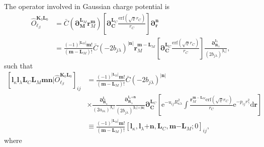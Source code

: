 \documentclass[a4paper,11pt,twoside,openright]{book}
\begin{document}
The operator involved in Gaussian charge potential is
\begin{align}
  \hat{O}_{\ell_{\beta}}^{\boldsymbol{K}_{0}\boldsymbol{L}_{0}}%
  &=\bar{C}\left(\boldsymbol{\partial}_{\boldsymbol{M}}^{\boldsymbol{L}_{M}}\boldsymbol{r}_{M}^{\boldsymbol{m}}\right)%
    \left[\boldsymbol{\partial}_{\boldsymbol{C}}^{\boldsymbol{L}_{C}}\frac{\mathrm{erf}\left(\sqrt{\varrho}r_{C}\right)}{r_{C}}\right]%
    \boldsymbol{\partial}_{\boldsymbol{r}}^{\boldsymbol{n}}\\
  &=\frac{(-1)^{|\boldsymbol{L}_{M}|}\boldsymbol{m}!}{(\boldsymbol{m}-\boldsymbol{L}_{M})!}%
    \bar{C}(-2b_{j\lambda})^{|\boldsymbol{n}|}%
    \boldsymbol{r}_{M}^{\boldsymbol{m}-\boldsymbol{L}_{M}}%
    \left[\boldsymbol{\partial}_{\boldsymbol{C}}^{\boldsymbol{L}_{C}}\frac{\mathrm{erf}\left(\sqrt{\varrho}r_{C}\right)}{r_{C}}\right]%
    \frac{\boldsymbol{\partial}_{\boldsymbol{R}_{\lambda}}^{\boldsymbol{l}_{\lambda}}}%
      {(2b_{j\lambda})^{|\boldsymbol{l}_{\lambda}|}},\nonumber
\end{align}
such that
\begin{align}
  \left[\boldsymbol{l}_{\kappa}\boldsymbol{l}_{\lambda}\boldsymbol{L}_{C}%
    \boldsymbol{L}_{M}\boldsymbol{m}\boldsymbol{n}\Big|%
    \hat{O}_{\ell_{\beta}}^{\boldsymbol{K}_{0}\boldsymbol{L}_{0}}\right]_{ij}
  &=\frac{(-1)^{|\boldsymbol{L}_{M}|}\boldsymbol{m}!}{(\boldsymbol{m}-\boldsymbol{L}_{M})!}%
    \bar{C}(-2b_{j\lambda})^{|\boldsymbol{n}|}\\
  &\times\frac{\boldsymbol{\partial}_{\boldsymbol{R}_{\kappa}}^{\boldsymbol{l}_{\kappa}}}%
      {(2a_{i\kappa})^{|\boldsymbol{l}_{\kappa}|}}%
    \frac{\boldsymbol{\partial}_{\boldsymbol{R}_{\lambda}}^{\boldsymbol{l}_{\lambda}\mathrm{+}\boldsymbol{n}}}%
      {(2b_{j\lambda})^{|\boldsymbol{l}_{\lambda}|\mathrm{+}|\boldsymbol{n}|}}%
    \boldsymbol{\partial}_{\boldsymbol{C}}^{\boldsymbol{L}_{C}}%
    \left[\mathrm{e}^{-u_{ij}R_{\kappa\lambda}^2}\int%
      \frac{\boldsymbol{r}_{M}^{\boldsymbol{m}-\boldsymbol{L}_{M}}\mathrm{erf}\left(\sqrt{\varrho}r_{C}\right)}{r_{C}}%
        \mathrm{e}^{-p_{ij}r_{\gamma}^2}\mathrm{d}\boldsymbol{r}\right]\nonumber\\
  &\equiv\frac{(-1)^{|\boldsymbol{L}_{M}|}\boldsymbol{m}!}{(\boldsymbol{m}-\boldsymbol{L}_{M})!}%
    \left[\boldsymbol{l}_{\kappa},\boldsymbol{l}_{\lambda}\mathrm{+}\boldsymbol{n},%
    \boldsymbol{L}_{C},\boldsymbol{m}\mathrm{-}\boldsymbol{L}_{M};0\right]_{ij},\nonumber
\end{align}
where
\end{document}
